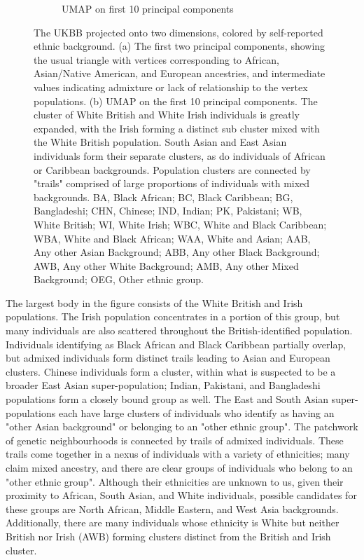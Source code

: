 \documentclass[12pt]{pnas-new}
\begin{document}
\begin{figure}
\begin{subfigure}{.5\columnwidth}
\caption{UMAP on first 10 principal components}%
\label{fig:umap_ukbb_pc10}%
\end{subfigure}%
\caption{The UKBB projected onto two dimensions, colored by self-reported ethnic background. (a) The first two principal components, showing the usual triangle with vertices corresponding to African, Asian/Native American, and European ancestries, and intermediate values indicating admixture or lack of relationship to the vertex populations. (b) UMAP on the first 10 principal components. The cluster of White British and White Irish individuals is greatly expanded, with the Irish forming a distinct sub cluster mixed with the White British population. South Asian and East Asian individuals form their separate clusters, as do individuals of African or Caribbean backgrounds. Population clusters are connected by "trails" comprised of large proportions of individuals with mixed backgrounds.
BA, Black African; 
BC, Black Caribbean; 
BG, Bangladeshi; 
CHN, Chinese; 
IND, Indian;
PK, Pakistani;
WB, White British;
WI, White Irish;
WBC, White and Black Caribbean; 
WBA, White and Black African; 
WAA, White and Asian;
AAB, Any other Asian Background; 
ABB, Any other Black Background;
AWB, Any other White Background;
AMB, Any other Mixed Background;
OEG, Other ethnic group. 
}
\label{fig:fig_ukbb}
\end{figure}

The largest body in the figure consists of the White British and Irish populations. The Irish population concentrates in a portion of this group, but many individuals are also scattered throughout the British-identified population. Individuals identifying as Black African and Black Caribbean partially overlap, but admixed individuals form distinct trails leading to Asian and European clusters. Chinese individuals form a cluster, within what is suspected to be a broader East Asian super-population; Indian, Pakistani, and Bangladeshi populations form a closely bound group as well. The East and South Asian super-populations each have large clusters of individuals who identify as having an "other Asian background" or belonging to an "other ethnic group". The patchwork of genetic neighbourhoods is connected by trails of admixed individuals. These trails come together in a nexus of individuals with a variety of ethnicities; many claim mixed ancestry, and there are clear groups of individuals who belong to an "other ethnic group". Although their ethnicities are unknown to us, given their proximity to African, South Asian, and White individuals, possible candidates for these groups are North African, Middle Eastern, and West Asia backgrounds. Additionally, there are many individuals whose ethnicity is White but neither British nor Irish (AWB) forming clusters distinct from the British and Irish cluster.
\end{document}
